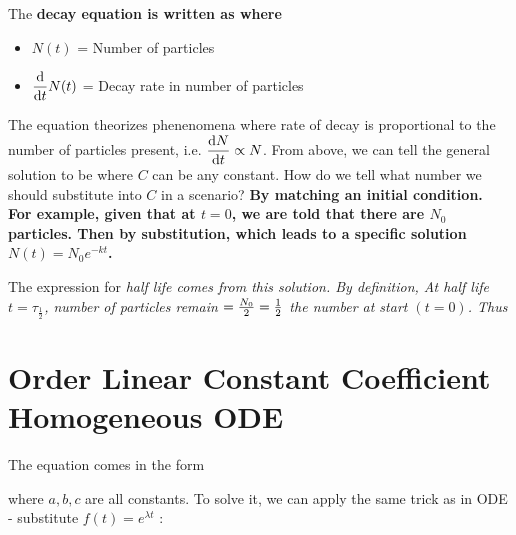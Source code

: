\documentclass[class=article, crop=false, 12pt]{standalone}
\begin{document}
\begin{example}
    The \bf{decay equation} is written as
    where
    \begin{itemize}
        \item $N(t)$ = Number of particles
        \item $\dvv{t}N(t)$ = Decay rate in number of particles
    \end{itemize}

    The equation theorizes phenenomena where rate of decay is proportional to 
    the number of particles present, i.e. $\dvv{N}{t} \propto N$.
    From above, we can tell the general solution to be
    where $C$ can be any constant. 
    How do we tell what number we should substitute into $C$ in a scenario? 
    \bf{By matching an initial condition.}\\

    For example, given that at $t=0$, we are told that there are $N_0$ particles.
    Then by substitution, 
    which leads to a specific solution $N(t) = N_0e^{-kt}$.\\

    \begin{notation}
        The expression for \it{half life} comes from this solution.
        By definition, At half life $t=\tau_\frac{1}{2}$, 
        number of particles remain $=\frac{N_0}{2} = \frac{1}{2}$ the number at start $(t=0)$.
        Thus
    \end{notation}
     
\end{example}


\linesep
\section{ Order Linear Constant Coefficient Homogeneous ODE}

The equation comes in the form

where $a,b,c$ are all constants. 
To solve it, we can apply the same trick as in  ODE - 
substitute $f(t) = e^{\lambda t}$ :
\end{document}
